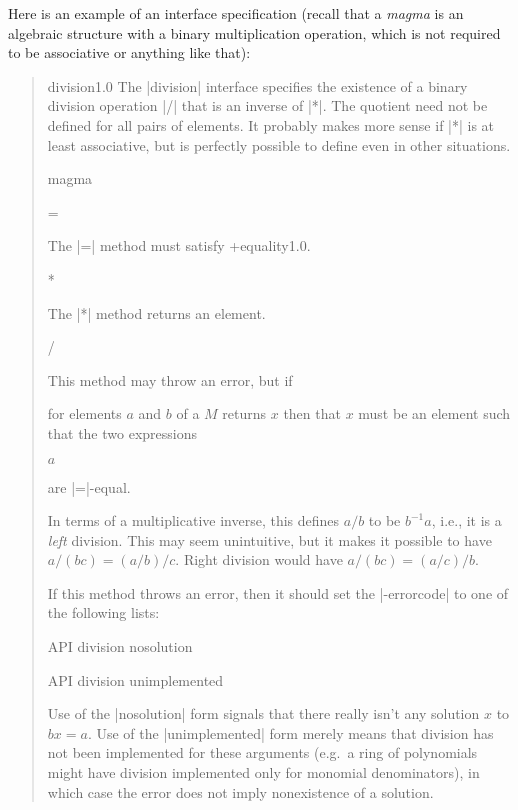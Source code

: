 \documentclass{mtmtcl}
\theoremstyle{plain}
\theoremstyle{remark}
\begin{document}
Here is an example of an interface specification (recall that a 
\emph{magma} is an algebraic structure with a binary multiplication 
operation, which is not required to be associative or anything like 
that):
\begin{quote}
  \small\leavevmode
  \begin{APIspec}{division}{1.0}
    The |division| interface specifies the existence of a binary 
    division operation |/| that is an inverse of |*|. The quotient 
    need not be defined for all pairs of elements. It probably makes 
    more sense if |*| is at least associative, but is perfectly 
    possible to define even in other situations.
    \begin{APIdescription}{magma}
      \begin{APImethod}{=}
         
      \end{APImethod}
        The |=| method must satisfy \APIref+{equality}{1.0}.
      \begin{APImethod}{*}
         
      \end{APImethod}
        The |*| method returns an element.
      \begin{APImethod}{/}
         
      \end{APImethod}
        This method may throw an error, but if
        \begin{displaysyntax}
          [$M$ / $a$ $b$]
        \end{displaysyntax}
        for elements $a$ and $b$ of a  $M$ returns $x$ 
        then that $x$ must be an element such that the two expressions
        \begin{displaysyntax}
          [$M$ * $b$ $x$]\par
          $a$
        \end{displaysyntax}
        are |=|-equal.
        
        \begin{remark}
          In terms of a multiplicative inverse, this defines $a/b$ 
          to be $b^{-1}a$, i.e., it is a \emph{left} division. This 
          may seem unintuitive, but it makes it possible to have 
          \(a/(bc) = (a/b)/c\). Right division would have \(a/(bc) = 
          (a/c)/b\).
        \end{remark}
        
        If this method throws an error, then it should set the 
        |-errorcode| to one of the following lists:
        \begin{displaysyntax}
          API division nosolution\par
          API division unimplemented
        \end{displaysyntax}
        Use of the |nosolution| form signals that there really isn't 
        any solution $x$ to \(bx=a\). Use of the |unimplemented| form 
        merely means that division has not been implemented for these 
        arguments (e.g.~a ring of polynomials might have division 
        implemented only for monomial denominators), in which case 
        the error does not imply nonexistence of a solution.
    \end{APIdescription}
    

\end{APIspec}
\end{quote}
\end{document}
